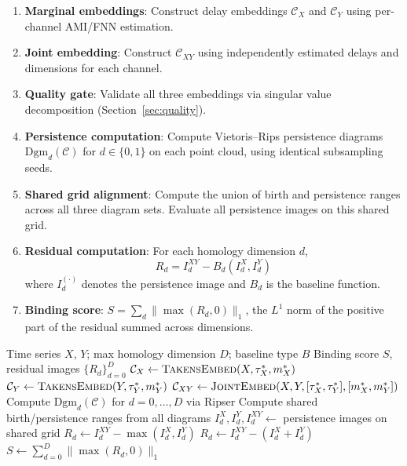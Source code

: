 \documentclass[11pt,a4paper]{article}
\begin{document}
\begin{enumerate}
    \item \textbf{Marginal embeddings}: Construct delay embeddings $\mathcal{C}_X$ and $\mathcal{C}_Y$ using per-channel AMI/FNN estimation.
    \item \textbf{Joint embedding}: Construct $\mathcal{C}_{XY}$ using independently estimated delays and dimensions for each channel.
    \item \textbf{Quality gate}: Validate all three embeddings via singular value decomposition (Section~\ref{sec:quality}).
    \item \textbf{Persistence computation}: Compute Vietoris--Rips persistence diagrams $\text{Dgm}_d(\mathcal{C})$ for $d \in \{0, 1\}$ on each point cloud, using identical subsampling seeds.
    \item \textbf{Shared grid alignment}: Compute the union of birth and persistence ranges across all three diagram sets. Evaluate all persistence images on this shared grid.
    \item \textbf{Residual computation}: For each homology dimension $d$,
    \begin{equation}\label{eq:residual}
        R_d = I_d^{XY} - B_d(I_d^X, I_d^Y)
    \end{equation}
    where $I_d^{(\cdot)}$ denotes the persistence image and $B_d$ is the baseline function.
    \item \textbf{Binding score}: $S = \sum_d \| \max(R_d, 0) \|_1$, the $L^1$ norm of the positive part of the residual summed across dimensions.
\end{enumerate}

\begin{algorithm}
\caption{Binding Detection}
\label{alg:binding}
\begin{algorithmic}[1]
\Require Time series $X$, $Y$; max homology dimension $D$; baseline type $B$
\Ensure Binding score $S$, residual images $\{R_d\}_{d=0}^D$
\State $\mathcal{C}_X \gets \Call{TakensEmbed}{X, \tau_X^*, m_X^*}$ 
\State $\mathcal{C}_Y \gets \Call{TakensEmbed}{Y, \tau_Y^*, m_Y^*}$
\State $\mathcal{C}_{XY} \gets \Call{JointEmbed}{X, Y, [\tau_X^*, \tau_Y^*], [m_X^*, m_Y^*]}$
\State {} 
    \State Compute $\text{Dgm}_d(\mathcal{C})$ for $d = 0, \ldots, D$ via Ripser \citep{bauer2021ripser}
\EndFor
\State Compute shared birth/persistence ranges from all diagrams
    \State $I_d^X, I_d^Y, I_d^{XY} \gets$ persistence images on shared grid
        \State $R_d \gets I_d^{XY} - \max(I_d^X, I_d^Y)$ 
    \Else
        \State $R_d \gets I_d^{XY} - (I_d^X + I_d^Y)$ 
    \EndIf
\EndFor
\State $S \gets \sum_{d=0}^{D} \|\max(R_d, 0)\|_1$
\end{algorithmic}
\end{algorithm}
\end{document}
